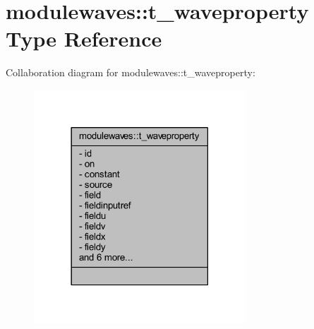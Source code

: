 \hypertarget{structmodulewaves_1_1t__waveproperty}{}\section{modulewaves\+:\+:t\+\_\+waveproperty Type Reference}
\label{structmodulewaves_1_1t__waveproperty}


Collaboration diagram for modulewaves\+:\+:t\+\_\+waveproperty\+:\nopagebreak
\begin{figure}[H]
\begin{center}
\leavevmode
\includegraphics[width=225pt]{structmodulewaves_1_1t__waveproperty__coll__graph}
\end{center}
\end{figure}
